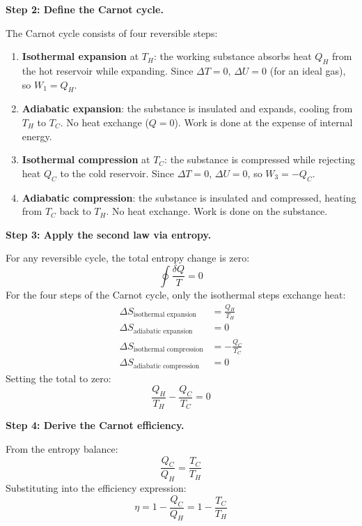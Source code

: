 \textbf{Step 2: Define the Carnot cycle.}

The Carnot cycle consists of four reversible steps:
\begin{enumerate}
\item \textbf{Isothermal expansion} at $T_H$: the working substance absorbs heat $Q_H$ from the hot reservoir while expanding. Since $\Delta T = 0$, $\Delta U = 0$ (for an ideal gas), so $W_1 = Q_H$.
\item \textbf{Adiabatic expansion}: the substance is insulated and expands, cooling from $T_H$ to $T_C$. No heat exchange ($Q = 0$). Work is done at the expense of internal energy.
\item \textbf{Isothermal compression} at $T_C$: the substance is compressed while rejecting heat $Q_C$ to the cold reservoir. Since $\Delta T = 0$, $\Delta U = 0$, so $W_3 = -Q_C$.
\item \textbf{Adiabatic compression}: the substance is insulated and compressed, heating from $T_C$ back to $T_H$. No heat exchange. Work is done on the substance.
\end{enumerate}

\textbf{Step 3: Apply the second law via entropy.}

For any reversible cycle, the total entropy change is zero:
\begin{equation}
\oint \frac{\delta Q}{T} = 0
\end{equation}
For the four steps of the Carnot cycle, only the isothermal steps exchange heat:
\begin{align}
\Delta S_{\text{isothermal expansion}} &= \frac{Q_H}{T_H} \\
\Delta S_{\text{adiabatic expansion}} &= 0 \\
\Delta S_{\text{isothermal compression}} &= -\frac{Q_C}{T_C} \\
\Delta S_{\text{adiabatic compression}} &= 0
\end{align}
Setting the total to zero:
\begin{equation}
\frac{Q_H}{T_H} - \frac{Q_C}{T_C} = 0
\end{equation}

\textbf{Step 4: Derive the Carnot efficiency.}

From the entropy balance:
\begin{equation}
\frac{Q_C}{Q_H} = \frac{T_C}{T_H}
\end{equation}
Substituting into the efficiency expression:
\begin{equation}
\eta = 1 - \frac{Q_C}{Q_H} = 1 - \frac{T_C}{T_H}
\end{equation}


